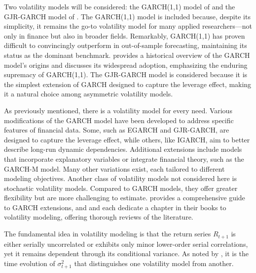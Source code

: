 Two volatility models will be considered: the GARCH(1,1) model of  and the GJR-GARCH model of . The GARCH(1,1) model is included because, despite its simplicity, it remains the go-to volatility model for many applied researchers—not only in finance but also in broader fields. Remarkably, GARCH(1,1) has proven difficult to convincingly outperform in out-of-sample forecasting, maintaining its status as the dominant benchmark.  provides a historical overview of the GARCH model’s origins and discusses its widespread adoption, emphasizing the enduring supremacy of GARCH(1,1). The GJR-GARCH model is considered because it is the simplest extension of GARCH designed to capture the leverage effect, making it a natural choice among asymmetric volatility models.

As previously mentioned, there is a volatility model for every need. Various modifications of the GARCH model have been developed to address specific features of financial data. Some, such as EGARCH and GJR-GARCH, are designed to capture the leverage effect, while others, like IGARCH, aim to better describe long-run dynamic dependencies. Additional extensions include models that incorporate explanatory variables or integrate financial theory, such as the GARCH-M model. Many other variations exist, each tailored to different modeling objectives. Another class of volatility models not considered here is stochastic volatility models. Compared to GARCH models, they offer greater flexibility but are more challenging to estimate.  provides a comprehensive guide to GARCH extensions, and  and  each dedicate a chapter in their books to volatility modeling, offering thorough reviews of the literature.

The fundamental idea in volatility modeling is that the return series $R_{t+1}$ is either serially uncorrelated or exhibits only minor lower-order serial correlations, yet it remains dependent through its conditional variance. As noted by , it is the time evolution of $\sigma^2_{t+1}$ that distinguishes one volatility model from another.

